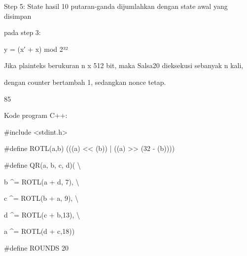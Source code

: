 \documentclass{article}
\begin{document}

Step 5: State hasil 10 putaran-ganda dijumlahkan dengan state awal yang disimpan 

pada step 3: 

              y = (x′ + x) mod 2³²

Jika plainteks berukuran n x 512 bit, maka Salsa20 dieksekusi sebanyak n kali, 

dengan counter bertambah 1, sedangkan nonce tetap.

85

Kode program C++:

\#include <stdint.h>

\#define ROTL(a,b) (((a) << (b)) | ((a) >> (32 - (b))))

\#define QR(a, b, c, d)(  \textbackslash{}


b \textasciicircum{}= ROTL(a + d, 7), \textbackslash{}


c \textasciicircum{}= ROTL(b + a, 9), \textbackslash{}


d \textasciicircum{}= ROTL(c + b,13), \textbackslash{}


a \textasciicircum{}= ROTL(d + c,18))

\#define ROUNDS 20
\end{document}
